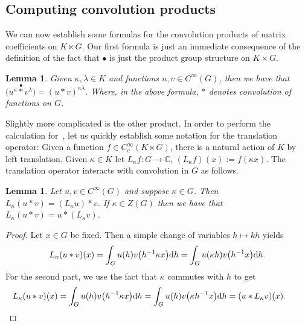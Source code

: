 \documentclass[pdftex]{sigma}
\numberwithin{equation}{section}
\newtheorem{Lemma}[Theorem]{Lemma}
\theoremstyle{definition}
\newcommand{\BBC}{\mathbb{C}}
\newcommand{\stardot}{\overset{{\bullet}}{*}}
\newcommand{\starcirc}{\overset{\circ}{*}}
\newcommand{\inv}{^{-1}}
\begin{document}
\subsection{Computing convolution products}
We can now establish some formulas for the convolution products of matrix coefficients on $K\ltimes G$. Our first formula is just an immediate consequence of the definition of the fact that $ \bullet $ is just the product group structure on $ K \times G $.
\begin{Lemma}
  Given $ \kappa, \lambda \in K $ and functions $ u, v \in C^\infty(G) $, then we have that
  $ \big(u^\kappa \stardot v^\lambda \big) = (u * v )^{\kappa \lambda}$.
  Where, in the above formula, $ * $ denotes convolution of functions on $ G $.
\end{Lemma}
Slightly more complicated is the other product. In order to perform the calculation for~\smash{$ \starcirc $}, let us quickly establish some notation for the translation operator: Given a function ${f \in C_c^\infty(K \ltimes G)}$, there is a natural action of $ K $ by left translation. Given $ \kappa \in K $ let
$L_\kappa f \colon G \to \BBC$, $(L_\kappa f) (x) := f(\kappa x)$.
The translation operator interacts with convolution in $ G $ as follows.

\begin{Lemma}\label{lemma:translation.and.convolution}
  Let $ u, v \in C^\infty(G) $ and suppose $ \kappa \in G $. Then
  $L_{\kappa} (u * v) = (L_\kappa u) * v$.
  If $ \kappa \in Z(G) $ then we have that
  $ L_\kappa( u * v) = u * (L_{\kappa} v)$.
\end{Lemma}
\begin{proof}
  Let $x\in G$ be fixed. Then a simple change of variables $ h \mapsto k h $ yields
    \begin{align*}L_\kappa(u * v)(x) =  \int_G u(h)v\big(h^{-1}\kappa x\big){\rm d}h
    = \int_G u(\kappa h) v\big(h\inv x\big) {\rm d}h.
    \end{align*}
    For the second part, we use the fact that $ \kappa $ commutes with $ h $ to get
  \begin{align*}
  L_\kappa(u * v)(x) =  \int_G u(h)v\big(h^{-1}\kappa x\big){\rm d}h
    = \int_G u(h)v\big(\kappa h^{-1}x\big){\rm d}h=(u * L_\kappa v)(x).\tag*{\qed}
    \end{align*}\renewcommand{\qed}{}
\end{proof}
\end{document}
